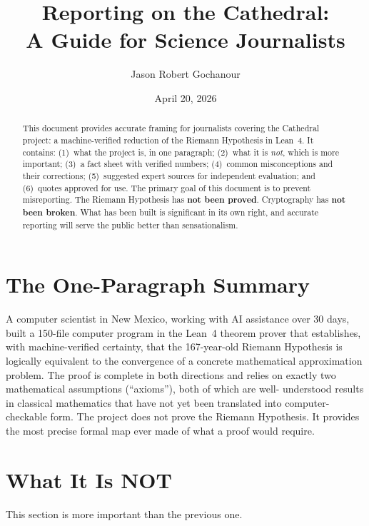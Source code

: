 \documentclass[11pt,a4paper]{article}
\title{%
  Reporting on the Cathedral:\\
  A Guide for Science Journalists%
}
\author{
  Jason Robert Gochanour
}
\date{April 20, 2026}
\begin{document}
\maketitle

\begin{abstract}
This document provides accurate framing for journalists covering
the Cathedral project: a machine-verified reduction of the
Riemann Hypothesis in Lean~4. It contains: (1)~what the project
is, in one paragraph; (2)~what it is \emph{not}, which is more
important; (3)~a fact sheet with verified numbers; (4)~common
misconceptions and their corrections; (5)~suggested expert sources
for independent evaluation; and (6)~quotes approved for use.
The primary goal of this document is to prevent misreporting.
The Riemann Hypothesis has \textbf{not been proved}. Cryptography
has \textbf{not been broken}. What has been built is significant
in its own right, and accurate reporting will serve the public
better than sensationalism.
\end{abstract}

\section{The One-Paragraph Summary}

A computer scientist in New Mexico, working with AI assistance over
30 days, built a 150-file computer program in the Lean~4 theorem
prover that establishes, with machine-verified certainty, that the
167-year-old Riemann Hypothesis is logically equivalent to the
convergence of a concrete mathematical approximation problem. The
proof is complete in both directions and relies on exactly two
mathematical assumptions (``axioms''), both of which are well-
understood results in classical mathematics that have not yet been
translated into computer-checkable form. The project does not prove
the Riemann Hypothesis. It provides the most precise formal map ever
made of what a proof would require.

\section{What It Is NOT}
\label{sec:not}

This section is more important than the previous one.
\end{document}
